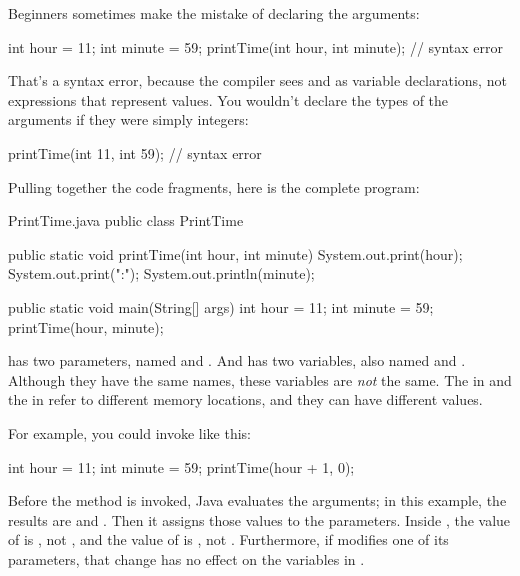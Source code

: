 Beginners sometimes make the mistake of declaring the arguments:

\begin{code}
int hour = 11;
int minute = 59;
printTime(int hour, int minute);  // syntax error
\end{code}

That's a syntax error, because the compiler sees  and  as variable declarations, not expressions that represent values.
You wouldn't declare the types of the arguments if they were simply integers:

\begin{code}
printTime(int 11, int 59);  // syntax error
\end{code}

Pulling together the code fragments, here is the complete program:


\begin{trinket}[340]{PrintTime.java}
public class PrintTime {

    public static void printTime(int hour, int minute) {
        System.out.print(hour);
        System.out.print(":");
        System.out.println(minute);
    }

    public static void main(String[] args) {
        int hour = 11;
        int minute = 59;
        printTime(hour, minute);
    }
}
\end{trinket}

 has two parameters, named  and .
And  has two variables, also named  and .
Although they have the same names, these variables are {\em not} the same.
The  in  and the  in  refer to different memory locations, and they can have different values.

For example, you could invoke  like this:

\begin{code}
int hour = 11;
int minute = 59;
printTime(hour + 1, 0);
\end{code}

Before the method is invoked, Java evaluates the arguments; in this example, the results are  and .
Then it assigns those values to the parameters.
Inside , the value of  is , not , and the value of  is , not .
Furthermore, if  modifies one of its parameters, that change has no effect on the variables in .


